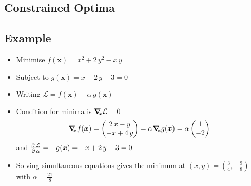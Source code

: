 
\begin{slide}
\section[-2]{Constrained Optima}
\pb
\pause{}
\begin{center}
  \pause
\end{center}
\end{slide}


\begin{slide}
\section[-2]{Example}

\begin{PauseHighLight}
  \begin{itemize}
  \item Minimise $f(\bm{x}) = x^2 + 2\,y^2 - x\,y$
  \item Subject to $g(\bm{x}) = x - 2\,y -3 = 0$\pause
  \item Writing $\mathcal{L} = f(\bm{x}) - \alpha\,g(\bm{x})$\pause
  \item Condition for minima is $\bm{\nabla}_{\!\!\scriptscriptstyle \bm{x}} \mathcal{L} = 0$
    \begin{align*}
      \bm{\nabla}_{\!\!\scriptscriptstyle \bm{x}} f(\bm{x}) = 
      \begin{pmatrix}
        2\,x -y \\ -x + 4\,y
      \end{pmatrix} =
      \alpha \bm{\nabla}_{\!\!\scriptscriptstyle \bm{x}} g(\bm{x}) = \alpha
      \begin{pmatrix}
        1 \\ -2
      \end{pmatrix}
    \end{align*}
    and $\frac{\partial^{\,}{\mathcal{L}}}{\partial\,{\alpha}} = -g(\bm{x}) = -x + 2\,y +3 = 0$\pause
  \item Solving simultaneous equations gives the minimum at $(x,y)=(\frac{3}{4}, -
  \frac{9}{8})$ with $\alpha= \frac{21}{8}$\pause
  \end{itemize}
\end{PauseHighLight}

\end{slide}



